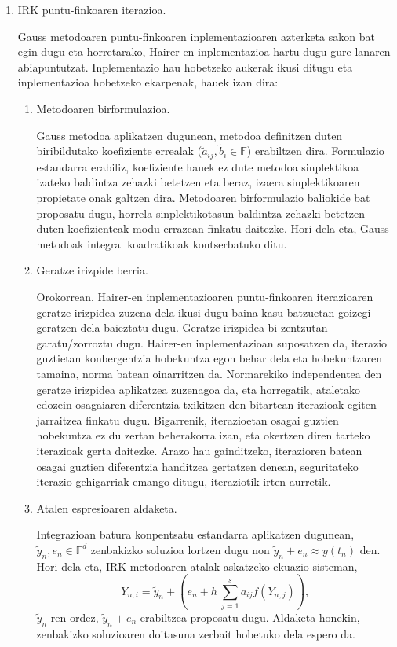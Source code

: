\begin{enumerate}
\item IRK puntu-finkoaren iterazioa.

Gauss metodoaren puntu-finkoaren inplementazioaren azterketa sakon bat egin dugu eta horretarako, Hairer-en inplementazioa \cite{Hairer2008} hartu dugu gure lanaren abiapuntutzat. Inplementazio hau hobetzeko aukerak ikusi ditugu eta inplementazioa hobetzeko ekarpenak, hauek izan dira:  

\begin{enumerate}
\item Metodoaren birformulazioa.

Gauss metodoa aplikatzen dugunean, metodoa definitzen duten biribildutako koefiziente errealak ($\tilde{a}_{ij}, \tilde{b}_i \in \mathbb{F}$) erabiltzen dira. Formulazio estandarra erabiliz, koefiziente hauek ez dute metodoa sinplektikoa izateko baldintza zehazki betetzen eta beraz, izaera sinplektikoaren propietate onak galtzen dira. Metodoaren birformulazio baliokide bat proposatu dugu, horrela sinplektikotasun baldintza zehazki betetzen duten koefizienteak modu errazean finkatu daitezke. Hori dela-eta, Gauss metodoak integral koadratikoak kontserbatuko ditu.

\item Geratze irizpide berria.

Orokorrean, Hairer-en inplementazioaren puntu-finkoaren iterazioaren geratze irizpidea zuzena dela ikusi dugu baina kasu batzuetan goizegi geratzen dela baieztatu dugu. Geratze irizpidea bi zentzutan garatu/zorroztu dugu. Hairer-en inplementazioan suposatzen da, iterazio guztietan konbergentzia hobekuntza egon behar dela eta hobekuntzaren tamaina, norma batean oinarritzen da. Normarekiko independentea den geratze irizpidea aplikatzea zuzenagoa da, eta horregatik, ataletako edozein osagaiaren diferentzia txikitzen den bitartean iterazioak egiten jarraitzea finkatu dugu. Bigarrenik, iterazioetan osagai guztien hobekuntza ez du zertan beherakorra izan, eta okertzen diren tarteko iterazioak gerta daitezke. Arazo hau gainditzeko, iterazioren batean osagai guztien diferentzia handitzea gertatzen denean, seguritateko iterazio gehigarriak emango ditugu, iteraziotik irten aurretik.   

\item Atalen espresioaren aldaketa.

Integrazioan batura konpentsatu estandarra aplikatzen dugunean, $\tilde{y}_n, e_n \in \mathbb{F}^d$ zenbakizko soluzioa  lortzen dugu non $\tilde{y}_n+e_n \approx y(t_n)$ den. Hori dela-eta, IRK metodoaren atalak askatzeko ekuazio-sisteman,
\begin{equation*}
Y_{n,i}=\tilde{y}_n + \left(e_n+ h \ \sum_{j=1}^{s} a_{ij} f(Y_{n,j}) \right),
\end{equation*}
$\tilde{y}_n$-ren ordez, $\tilde{y}_n+e_n$ erabiltzea proposatu dugu. Aldaketa honekin, zenbakizko soluzioaren doitasuna zerbait hobetuko dela espero da.
 

\end{enumerate}
\end{enumerate}

